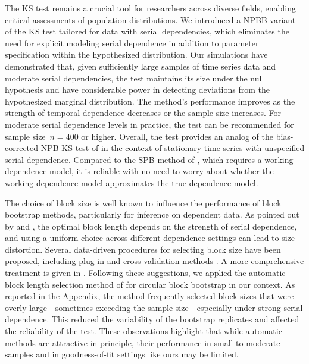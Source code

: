 \documentclass[12pt]{article}
\begin{document}
The KS test remains a crucial tool for researchers across diverse fields,
enabling critical assessments of population distributions. We introduced a
NPBB variant of the KS test tailored for data with
serial dependencies, which eliminates the need for explicit modeling serial
dependence in addition to parameter specification within the hypothesized
distribution. Our simulations have demonstrated that, given
sufficiently large samples of time series data and moderate serial dependencies,
the test maintains its size under the null hypothesis and have considerable
power in detecting deviations from the hypothesized marginal distribution. The
method's performance improves as the strength of temporal dependence decreases
or the sample size increases. For moderate serial dependence levels in practice,
the test can be recommended for sample size~$n = 400$ or higher.
Overall, the test provides an analog of the bias-corrected NPB KS test of
\citet{babu2004goodness} in the context of stationary time
series with unspecified serial dependence. Compared to the SPB method
of \citet{zeimbekakis2024misuses}, which requires a working dependence model, it
is reliable with no need to worry about whether the working dependence
model approximates the true dependence model.


The choice of block size is well known to influence the performance of
block bootstrap methods, particularly for inference on dependent
data. As pointed out by \citet{hall1995blocking} and
\citet{lahiri1999theoretical}, the optimal block length depends on the
strength of serial dependence, and using a uniform choice across
different dependence settings can lead to size distortion. Several
data-driven procedures for selecting block size have been proposed,
including plug-in and cross-validation methods
\citep{buhlmann2002bootstraps, politis2004automatic}. A more
comprehensive treatment is given in
\citet{lahiri2013resampling}. Following these suggestions, we applied
the automatic block length selection method of
\citet{politis2004automatic} for circular block bootstrap in our
context. As reported in the Appendix, the method frequently selected
block sizes that were overly large—sometimes exceeding the sample
size—especially under strong serial dependence. This reduced the
variability of the bootstrap replicates and affected the reliability
of the test. These observations highlight that while automatic methods
are attractive in principle, their performance in small to moderate
samples and in goodness-of-fit settings like ours may be limited.
\end{document}
